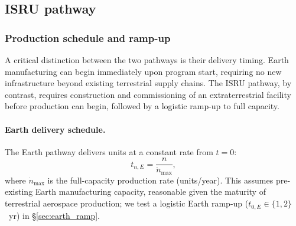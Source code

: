 \documentclass[preprint,12pt]{elsarticle}
\begin{document}
\subsection{ISRU pathway}

\subsubsection{Production schedule and ramp-up}

A critical distinction between the two pathways is their delivery timing. Earth manufacturing can begin immediately upon program start, requiring no new infrastructure beyond existing terrestrial supply chains. The ISRU pathway, by contrast, requires construction and commissioning of an extraterrestrial facility before production can begin, followed by a logistic ramp-up to full capacity.

\paragraph{Earth delivery schedule.} The Earth pathway delivers units at a constant rate from $t = 0$:
\begin{equation}
  t_{n,E} = \frac{n}{\dot{n}_{\max}},
  \label{eq:earth_schedule}
\end{equation}
where $\dot{n}_{\max}$ is the full-capacity production rate (units/year). This assumes pre-existing Earth manufacturing capacity, reasonable given the maturity of terrestrial aerospace production; we test a logistic Earth ramp-up ($t_{0,E} \in \{1, 2\}$~yr) in \S\ref{sec:earth_ramp}.
\end{document}
